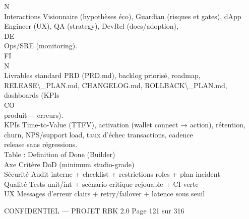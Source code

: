 \vspace{0.5em}
\vspace{0.5em}
\vspace{0.5em}
N\\
Interactions Visionnaire (hypothèses éco), Guardian (risques et gates), dApp Engineer (UX), QA (strategy), DevRel (docs/adoption),\\
\vspace{0.5em}
\vspace{0.5em}
\vspace{0.5em}
\vspace{0.5em}
DE\\
Ops/SRE (monitoring).\\
\vspace{0.5em}
\vspace{0.5em}
\vspace{0.5em}
\vspace{0.5em}
FI\\
N\\
Livrables standard    PRD (PRD.md), backlog priorisé, roadmap, RELEASE\textbackslash{}_PLAN.md, CHANGELOG.md, ROLLBACK\textbackslash{}_PLAN.md, dashboards (KPIs\\
CO\\
produit + erreurs).\\
\vspace{0.5em}
KPIs Time-to-Value (TTFV), activation (wallet connect → action), rétention, churn, NPS/support load, taux d’échec transactions, cadence\\
release sans régressions.\\
\vspace{0.5em}
Table : Definition of Done (Builder)\\
\vspace{0.5em}
Axe      Critère DoD (minimum studio-grade)\\
Sécurité Audit interne + checklist + restrictions roles + plan incident\\
Qualité Tests unit/int + scénario critique rejouable + CI verte\\
UX       Messages d’erreur clairs + retry/failover + latence sous seuil\\
\vspace{0.5em}
\vspace{0.5em}
\vspace{0.5em}
\begin{confidential}CONFIDENTIEL — PROJET RBK 2.0                                    Page 121 sur 316\end{confidential}
